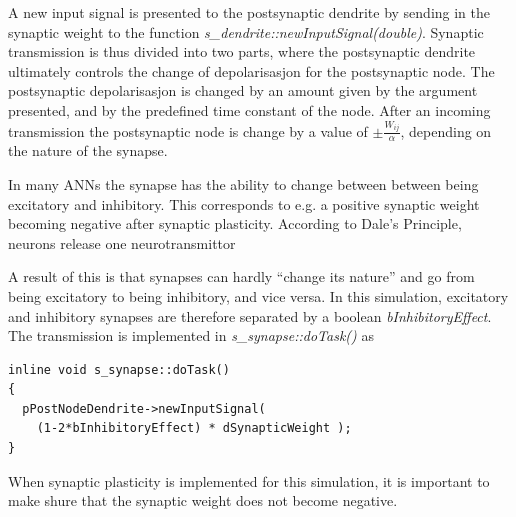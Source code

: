 	A new input signal is presented to the postsynaptic dendrite by sending in the synaptic weight to the function \emph{s\_dendrite::newInputSignal(double)}.
	Synaptic transmission is thus divided into two parts, where the postsynaptic dendrite ultimately controls the change of depolarisasjon for the postsynaptic node.
	The postsynaptic depolarisasjon is changed by an amount given by the argument presented, and by the predefined time constant of the node.
	After an incoming transmission the postsynaptic node is change by a value of $\pm \frac{W_{ij}}{\alpha}$, depending on the nature of the synapse.

	In many ANNs the synapse has the ability to change between between being excitatory and inhibitory. 
	This corresponds to e.g. a positive synaptic weight becoming negative after synaptic plasticity.
	According to Dale's Principle, neurons release one neurotransmittor\cite{NeuroscienceExploringTheBrain3edKAP6}

	A result of this is that synapses can hardly ``change its nature'' and go from being excitatory to being inhibitory, and vice versa.
	In this simulation, excitatory and inhibitory synapses are therefore separated by a boolean \emph{bInhibitoryEffect}. 
	The transmission is implemented in \emph{s\_synapse::doTask()} as
\begin{lstlisting}
inline void s_synapse::doTask()
{
  pPostNodeDendrite->newInputSignal( 
    (1-2*bInhibitoryEffect) * dSynapticWeight );
}
\end{lstlisting}

	When synaptic plasticity is implemented for this simulation, it is important to make shure that the synaptic weight does not become negative. 

